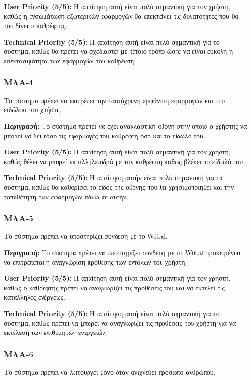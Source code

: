 \noindent\textbf{User Priority (5/5):} Η απαίτηση αυτή είναι πολύ σημαντική για τον χρήστη, καθώς η ενσωμάτωση εξωτερικών εφαρμογών θα επεκτείνει τις δυνατότητες που θα του δίνει ο καθρέφτης.

\noindent\textbf{Technical Priority (5/5):} Η απαίτηση αυτή είναι πολύ σημαντική για το σύστημα, καθώς θα πρέπει να σχεδιαστεί με τέτοιο τρόπο ώστε να είναι εύκολη η επεκτασιμότητα των εφαρμογών του καθρέφτη.

\subsubsection{\underline{ΜΛΑ-4}}
\noindent Το σύστημα πρέπει να επιτρέπει την ταυτόχρονη εμφάνιση εφαρμογών και του ειδώλου του χρήστη.

\noindent\textbf{Περιγραφή:} Το σύστημα πρέπει να έχει ανακλαστική οθόνη στην οποία ο χρήστης να μπορεί να δει τόσο τις εφαρμογές του καθρέφτη όσο και το είδωλό του.

\noindent\textbf{User Priority (5/5):} Η απαίτηση αυτή είναι πολύ σημαντική για τον χρήστη, καθώς θέλει να μπορεί να αλληλεπιδρά με τον καθρέφτη καθώς βλέπει το είδωλό του.

\noindent\textbf{Technical Priority (5/5):} Η απαίτηση αυτήν είναι πολύ σημαντική για το σύστημα, καθώς θα καθορίσει το είδος της οθόνης που θα χρησιμοποιηθεί και την τοποθέτηση των εφαρμογών πάνω σε αυτήν.

\subsubsection{\underline{ΜΛΑ-5}}
\noindent Το σύστημα πρέπει να υποστηρίζει σύνδεση με το Wit.ai.

\noindent\textbf{Περιγραφή:} Το σύστημα πρέπει να υποστηρίζει σύνδεση με το Wit.ai προκειμένου να επιτρέπεται η αναγνώριση πρόθεσης των εντολών του χρήστη.

\noindent\textbf{User Priority (5/5):} Η απαίτηση αυτή είναι πολύ σημαντική για τον χρήστη, καθώς ο καθρέφτης πρέπει να αναγνωρίζει τις προθέσεις του και να εκτελεί τις κατάλληλες ενέργειες.

\noindent\textbf{Technical Priority (5/5):} Η απαίτηση αυτή είναι πολύ σημαντική για το σύστημα, καθώς πρέπει να μπορεί να αναγνωρίζει τις προθέσεις του χρήστη για να εκτέλεση των επιθυμητών ενεργειών.

\subsubsection{\underline{ΜΛΑ-6}}
\noindent Το σύστημα πρέπει να λειτουργεί μόνο όταν ανιχνεύει πρόσωπο ανθρώπου.

